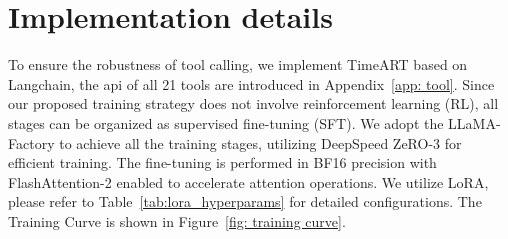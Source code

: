 \appendix

\section{Implementation details}
\label{app: settings}
To ensure the robustness of tool calling, we implement TimeART based on Langchain, the api of all 21 tools are introduced in Appendix~\ref{app: tool}. Since our proposed training strategy does not involve reinforcement learning (RL), all stages can be organized as supervised fine-tuning (SFT). We adopt the LLaMA-Factory to achieve all the training stages, utilizing DeepSpeed ZeRO-3 for efficient training. The fine-tuning is performed in BF16 precision with FlashAttention-2 enabled to accelerate attention operations. We utilize LoRA, please refer to Table~\ref{tab:lora_hyperparams} for detailed configurations. The Training Curve is shown in Figure~\ref{fig: training curve}.


\begin{table}[!htbp]
    \centering
    \caption{Hyper-parameters and training time of fine-tuning the Qwen3 8B based on the TimeToolBench.}
    \label{tab:lora_hyperparams}
\end{table}

